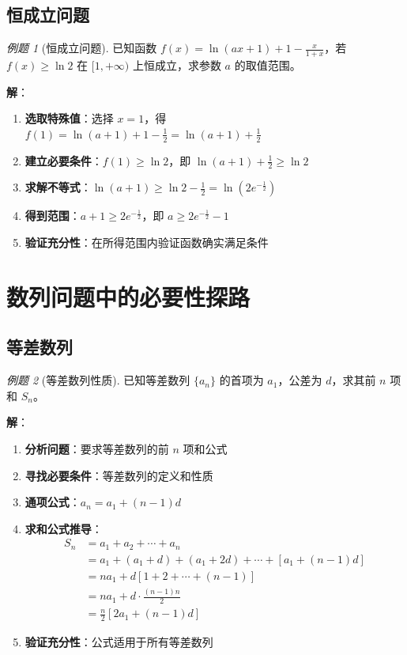 \documentclass[a4paper,11pt]{ctexart}
\newcommand{\keypoint}[1]{\textcolor{secondary}{\textbf{#1}}}
\theoremstyle{definition}
\theoremstyle{remark}
\newtheorem{example}{例题}[section]
\begin{document}
\subsection{恒成立问题}

\begin{example}[恒成立问题]
已知函数 $f(x) = \ln(ax + 1) + 1 - \frac{x}{1 + x}$，若 $f(x) \geq \ln 2$ 在 $[1, +\infty)$ 上恒成立，求参数 $a$ 的取值范围。

\textbf{解}：
\begin{enumerate}
    \item \keypoint{选取特殊值}：选择 $x = 1$，得 $f(1) = \ln(a + 1) + 1 - \frac{1}{2} = \ln(a + 1) + \frac{1}{2}$
    \item \keypoint{建立必要条件}：$f(1) \geq \ln 2$，即 $\ln(a + 1) + \frac{1}{2} \geq \ln 2$
    \item \keypoint{求解不等式}：$\ln(a + 1) \geq \ln 2 - \frac{1}{2} = \ln(2e^{-\frac{1}{2}})$
    \item \keypoint{得到范围}：$a + 1 \geq 2e^{-\frac{1}{2}}$，即 $a \geq 2e^{-\frac{1}{2}} - 1$
    \item \keypoint{验证充分性}：在所得范围内验证函数确实满足条件
\end{enumerate}
\end{example}

\newpage

\section{数列问题中的必要性探路}

\subsection{等差数列}

\begin{example}[等差数列性质]
已知等差数列 $\{a_n\}$ 的首项为 $a_1$，公差为 $d$，求其前 $n$ 项和 $S_n$。

\textbf{解}：
\begin{enumerate}
    \item \keypoint{分析问题}：要求等差数列的前 $n$ 项和公式
    \item \keypoint{寻找必要条件}：等差数列的定义和性质
    \item \keypoint{通项公式}：$a_n = a_1 + (n-1)d$
    \item \keypoint{求和公式推导}：
    \begin{align}
    S_n &= a_1 + a_2 + \cdots + a_n \\
    &= a_1 + (a_1 + d) + (a_1 + 2d) + \cdots + [a_1 + (n-1)d] \\
    &= na_1 + d[1 + 2 + \cdots + (n-1)] \\
    &= na_1 + d \cdot \frac{(n-1)n}{2} \\
    &= \frac{n}{2}[2a_1 + (n-1)d]
    \end{align}
    \item \keypoint{验证充分性}：公式适用于所有等差数列
\end{enumerate}
\end{example}
\end{document}
